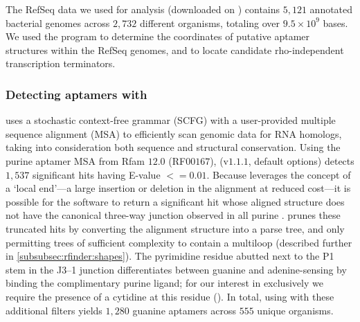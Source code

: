 The RefSeq data we used for analysis (downloaded on \fnaRetrievalTime)
contains $5,121$ annotated bacterial genomes
across $2,732$ different organisms, totaling over $9.5 \times 10^9$ bases. We used the
program \infernal to determine the coordinates of putative aptamer structures
within the RefSeq genomes, and \tthp to locate candidate rho-independent
transcription terminators.

\subsubsection{Detecting aptamers with \infernal}
\label{subsubsec:rfinder:infernal}

\infernal \citep{infernal,nawrocki:2013hk} uses a stochastic context-free
grammar (SCFG) with a user-provided multiple sequence alignment (MSA) to
efficiently scan genomic data for RNA homologs, taking into consideration both
sequence and structural conservation. Using the purine aptamer MSA from Rfam $12.0$
(RF$00167$), \infernal (v$1.1.1$, default options) detects $1,537$ significant hits
having E-value $<= 0.01$. Because \infernal leverages the concept of a
`local end'---a large insertion or deletion in the alignment at reduced cost---it
is possible for the software to return a significant hit whose aligned structure
does not have the canonical three-way junction observed in all purine
\rbs. \rfinder prunes these truncated \infernal hits by converting the
alignment structure into a parse tree, and only permitting trees of sufficient
complexity to contain a multiloop (described further in
\ref{subsubsec:rfinder:shapes}). The pyrimidine residue abutted next to the P1
stem in the J3--1 junction differentiates between guanine and adenine-sensing
\rbs by binding the complimentary purine ligand; for our interest in \grbs
exclusively we require the presence of a cytidine at this residue
(). In total, using
\infernal with these additional filters yields $1,280$ guanine aptamers across $555$
unique organisms.

